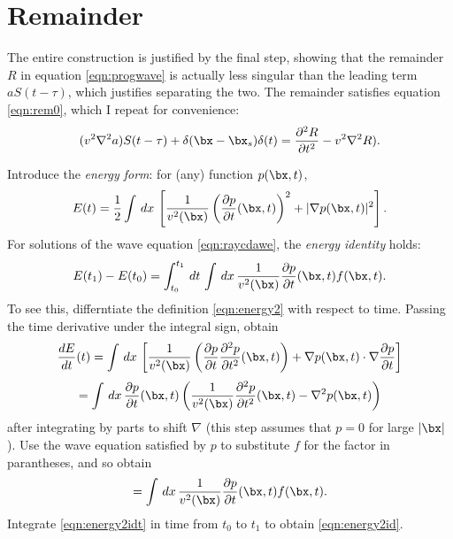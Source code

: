 \section{Remainder}

The entire construction is justified by the final step, showing that
the remainder
$R$ in equation \ref{eqn:progwave} is actually less singular than the
leading term $aS(t-\tau)$, which justifies separating the two. The
remainder satisfies equation 
\ref{eqn:rem0}, which I repeat for convenience:
\begin{equation}
\label{eqn:rem}
(v^2\nabla^2 a) S(t-\tau) + \delta(\bx-\bx_s)\delta(t)
   = \frac {\partial ^2 R}{\partial t^2} -  v^2 \nabla^2 R).
\end{equation}

Introduce the {\em energy form}: for (any) function $p(\bx,t)$,
\begin{equation}
\label{eqn:energy2}
E(t) = \frac{1}{2}\int\, dx\, \left[\frac{1}{v^2(\bx)}\left(\frac{\partial p}{\partial
    t}(\bx,t)\right)^2 + |\nabla p(\bx,t)|^2\right].
\end{equation}
For solutions of the wave equation \ref{eqn:raycdawe}, the {\em energy
  identity} holds:
\begin{equation}
\label{eqn:energy2id}
E(t_1)-E(t_0) = \int_{t_0}^{t_1}\,dt\,\int \,dx\, \frac{1}{v^2(\bx)}\frac{\partial p}{\partial
    t}(\bx,t)f(\bx,t).
\end{equation}
To see this, differntiate the definition \ref{eqn:energy2} with respect to time. Passing the time derivative under the integral sign, obtain
\[
\frac{dE}{dt}(t) = \int\, dx\, \left[\frac{1}{v^2(\bx)}\left(\frac{\partial p}{\partial
    t}\frac{\partial^2 p}{\partial
    t^2}(\bx,t)\right) + \nabla p(\bx,t) \cdot \nabla \frac{\partial p}{\partial
    t}\right]
\]
\[
=\int\, dx\, \frac{\partial p}{\partial
    t}(\bx,t)\left(\frac{1}{v^2(\bx)}\frac{\partial^2 p}{\partial
    t^2}(\bx,t) - \nabla^2 p(\bx,t) \right)
\]
after integrating by parts to shift $\nabla$ (this step assumes that $p=0$ for large $|\bx|$).
Use the wave equation satisfied by $p$ to substitute $f$ for the factor in parantheses, and so obtain 
\begin{equation}
\label{eqn:energy2idt}
= \int \,dx\, \frac{1}{v^2(\bx)}\frac{\partial p}{\partial
    t}(\bx,t)f(\bx,t).
\end{equation}
Integrate \ref{eqn:energy2idt} in time from $t_0$ to $t_1$ to obtain \ref{eqn:energy2id}.

